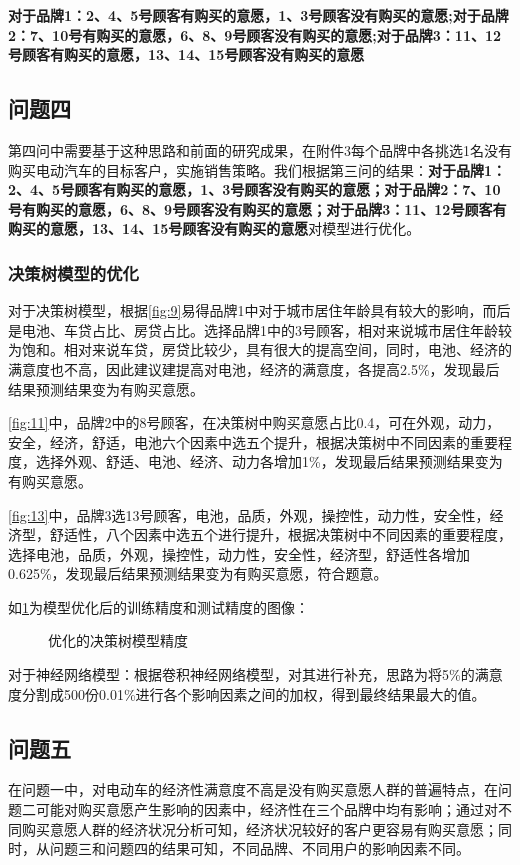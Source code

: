 \documentclass{JXUSTmodeling}
\begin{document}
\textbf{对于品牌1：2、4、5号顾客有购买的意愿，1、3号顾客没有购买的意愿;对于品牌2：7、10号有购买的意愿，6、8、9号顾客没有购买的意愿;对于品牌3：11、12号顾客有购买的意愿，13、14、15号顾客没有购买的意愿}

\subsection{问题四}\label{sub:5.4}
第四问中需要基于这种思路和前面的研究成果，在附件3每个品牌中各挑选1名没有购买电动汽车的目标客户，实施销售策略。我们根据第三问的结果：\textbf{对于品牌1：2、4、5号顾客有购买的意愿，1、3号顾客没有购买的意愿；对于品牌2：7、10号有购买的意愿，6、8、9号顾客没有购买的意愿；对于品牌3：11、12号顾客有购买的意愿，13、14、15号顾客没有购买的意愿}对模型进行优化。
\subsubsection{决策树模型的优化}
对于决策树模型，根据\ref{fig:9}易得品牌1中对于城市居住年龄具有较大的影响，而后是电池、车贷占比、房贷占比。选择品牌1中的3号顾客，相对来说城市居住年龄较为饱和。相对来说车贷，房贷比较少，具有很大的提高空间，同时，电池、经济的满意度也不高，因此建议建提高对电池，经济的满意度，各提高2.5\%，发现最后结果预测结果变为有购买意愿。

\ref{fig:11}中，品牌2中的8号顾客，在决策树中购买意愿占比0.4，可在外观，动力，安全，经济，舒适，电池六个因素中选五个提升，根据决策树中不同因素的重要程度，选择外观、舒适、电池、经济、动力各增加1\%，发现最后结果预测结果变为有购买意愿。

\ref{fig:13}中，品牌3选13号顾客，电池，品质，外观，操控性，动力性，安全性，经济型，舒适性，八个因素中选五个进行提升，根据决策树中不同因素的重要程度，选择电池，品质，外观，操控性，动力性，安全性，经济型，舒适性各增加0.625\%，发现最后结果预测结果变为有购买意愿，符合题意。

如\ref{fig:20}为模型优化后的训练精度和测试精度的图像：
\begin{figure}[!htbp]
	\centering
	\caption{优化的决策树模型精度}
	\label{fig:20}
\end{figure}
对于神经网络模型：根据卷积神经网络模型，对其进行补充，思路为将5\%的满意度分割成500份0.01\%进行各个影响因素之间的加权，得到最终结果最大的值。

\subsection{问题五}\label{sub:5.5}
在问题一中，对电动车的经济性满意度不高是没有购买意愿人群的普遍特点，在问题二可能对购买意愿产生影响的因素中，经济性在三个品牌中均有影响；通过对不同购买意愿人群的经济状况分析可知，经济状况较好的客户更容易有购买意愿；同时，从问题三和问题四的结果可知，不同品牌、不同用户的影响因素不同。
\end{document}
